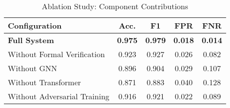 \begin{table}[h]
\centering
\caption{Ablation Study: Component Contributions}
\begin{tabular}{lcccc}
\toprule
\textbf{Configuration} & \textbf{Acc.} & \textbf{F1} & \textbf{FPR} & \textbf{FNR} \\
\midrule
\textbf{Full System} & \textbf{0.975} & \textbf{0.979} & \textbf{0.018} & \textbf{0.014} \\
\midrule
Without Formal Verification & 0.923 & 0.927 & 0.026 & 0.082 \\
Without GNN & 0.896 & 0.904 & 0.029 & 0.107 \\
Without Transformer & 0.871 & 0.883 & 0.040 & 0.128 \\
Without Adversarial Training & 0.916 & 0.921 & 0.022 & 0.089 \\
\bottomrule
\end{tabular}
\label{tab:ablation}
\end{table}
